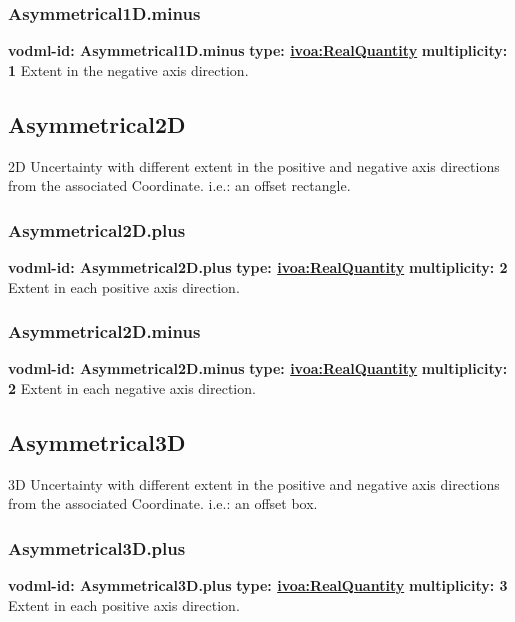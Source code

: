     \subsubsection{Asymmetrical1D.minus}
      \textbf{vodml-id: Asymmetrical1D.minus} \newline
      \textbf{type: \hyperref[sect:ivoa]{ivoa:RealQuantity}} \newline
      \textbf{multiplicity: 1} \newline 
      Extent in the negative axis direction.

  \subsection{Asymmetrical2D}
  \label{sect:Asymmetrical2D}
    2D Uncertainty with different extent in the positive and negative axis directions from the associated Coordinate. i.e.: an offset rectangle.

    \subsubsection{Asymmetrical2D.plus}
      \textbf{vodml-id: Asymmetrical2D.plus} \newline
      \textbf{type: \hyperref[sect:ivoa]{ivoa:RealQuantity}} \newline
      \textbf{multiplicity: 2} \newline 
      Extent in each positive axis direction.

    \subsubsection{Asymmetrical2D.minus}
      \textbf{vodml-id: Asymmetrical2D.minus} \newline
      \textbf{type: \hyperref[sect:ivoa]{ivoa:RealQuantity}} \newline
      \textbf{multiplicity: 2} \newline 
      Extent in each negative axis direction.

  \subsection{Asymmetrical3D}
  \label{sect:Asymmetrical3D}
    3D Uncertainty with different extent in the positive and negative axis directions from the associated Coordinate. i.e.: an offset box.

    \subsubsection{Asymmetrical3D.plus}
      \textbf{vodml-id: Asymmetrical3D.plus} \newline
      \textbf{type: \hyperref[sect:ivoa]{ivoa:RealQuantity}} \newline
      \textbf{multiplicity: 3} \newline 
      Extent in each positive axis direction.

